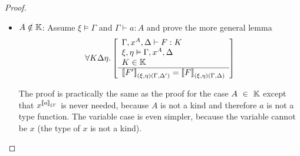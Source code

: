 \begin{theorem}
\begin{proof}
\begin{itemize}
        \item $A \notin \mathbb{K}$:
            Assume $\xi \vDash \Gamma$ and $\Gamma \vdash a : A$ and prove the
            more general lemma
            $$
            \forall K \Delta \eta. \left[ \begin{array}{l} 
                \Gamma,x^A,\Delta \vdash F : K
                \\
                \xi,\eta \vDash \Gamma,x^A,\Delta
                \\
                K \in \mathbb{K}
             \\ \hline 
                {{{[\![}F' {]\!]}}_{(\xi,\eta)(\Gamma,\Delta')}}
                =
                {{{[\![} F {]\!]}}_{(\xi,\eta)(\Gamma,\Delta)}}
            \end{array} \right]
            $$

            The proof is practically the same as the proof for the case
            $A \in \Kinds$ except that $x^{{{{[\![} a {]\!]}}_{\xi\Gamma}}}$ is never needed, because $A$
            is not a kind and therefore $a$ is not a type function. The variable
            case is even simpler, because the variable cannot be $x$ (the type
            of $x$ is not a kind).
        \end{itemize}
    \end{proof}
\end{theorem}



